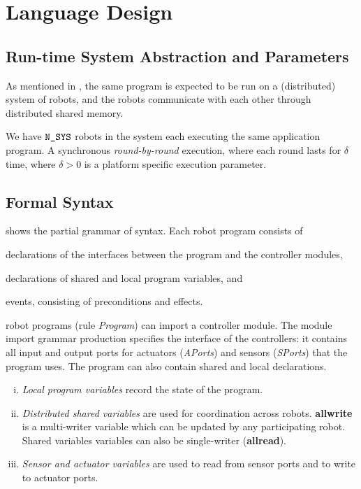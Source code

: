 \section{\lgname Language Design}
\label{sec:language}


\subsection{Run-time System Abstraction and Parameters}

As mentioned in , the same \lgname program is expected to be run on a (distributed) system of robots,
and the robots communicate with each other through distributed shared memory.

%
We have $\texttt{N\_SYS}$ robots in the system each executing the same \lgname application program.
A synchronous \emph{round-by-round} execution,
where each round lasts for $\delta$ time, where $\delta >0$ is a platform specific execution parameter.


\subsection{Formal Syntax}\label{sec:syntax}

 shows the partial grammar of \lgname syntax.
Each robot program consists of
\begin{inparaenum}[(a)]
\item declarations of the interfaces between the program and the controller modules,
\item declarations of shared and local program variables, and
\item events, consisting of preconditions and effects.
\end{inparaenum}
robot programs (rule \emph{Program}) can import a controller module.
The module import grammar production specifies the interface of the controllers:
it contains all input and output ports for actuators (\emph{APorts}) and sensors (\emph{SPorts}) that the program uses.
The program can also contain shared and local declarations.

\begin{enumerate}[i)]
\item \emph{Local program variables} record the state of the program.
\item \emph{Distributed shared variables} are used for coordination across robots.
      \textbf{allwrite} is a multi-writer variable which can be updated by any participating robot.
      Shared variables variables can also be single-writer (\textbf{allread}).
\item \emph{Sensor and actuator variables} are used to read from sensor ports and to write to actuator ports.
\end{enumerate}

